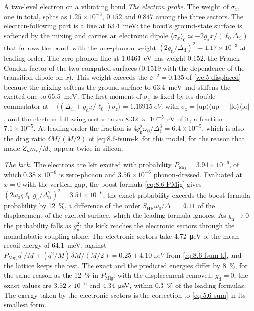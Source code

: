 \begin{workedexample}{A two-level electron on a vibrating bond}
\emph{The electron probe.} The weight of $\sigma_x$, one in total, splits as $1.25\times10^{-3}$, $0.152$ and $0.847$ among the three sectors. The electron-following part is a line at \SI{63.4}{meV}: the bond's ground-state surface is softened by the mixing and carries an electronic dipole $\langle\sigma_x\rangle_0 \simeq -2g_{\mathrm{n}}x/(\ell_0\Delta_{\mathrm{tl}})$ that follows the bond, with the one-phonon weight $(2g_{\mathrm{n}}/\Delta_{\mathrm{tl}})^2 = 1.17\times10^{-3}$ at leading order. The zero-phonon line at \SI{1.0463}{eV} has weight $0.152$, the Franck--Condon factor of the two computed surfaces (0.1519 with the dependence of the transition dipole on $x$). This weight exceeds the $\ee^{-2} = 0.135$ of \cref{we:5-displaced} because the mixing softens the ground surface to \SI{63.4}{meV} and stiffens the excited one to \SI{65.5}{meV}. The first moment of $\sigma_x$ is fixed by its double commutator at $-\langle(\Delta_{\mathrm{tl}} + g_{\mathrm{d}}x/\ell_0)\sigma_z\rangle = \SI{1.16915}{eV}$, with $\sigma_z = |\mathrm{up}\rangle\langle\mathrm{up}| - |\mathrm{lo}\rangle\langle\mathrm{lo}|$, and the electron-following sector takes \SI{8.32e-5}{eV} of it, a fraction $7.1\times10^{-5}$. At leading order the fraction is $4g_{\mathrm{n}}^2\omega_0/\Delta_{\mathrm{tl}}^3 = 6.4\times10^{-5}$, which is also the drag ratio $\delta M/(M/2)$ of \cref{eq:8.6-fsum-k} for this model, for the reason that made $Z_\kappa m_e/M_\kappa$ appear twice in silicon.

\emph{The kick.} The electrons are left excited with probability $P_{\mathrm{Mig}} = 3.94\times10^{-6}$, of which $0.38\times10^{-6}$ is zero-phonon and $3.56\times10^{-6}$ phonon-dressed. Evaluated at $x = 0$ with the vertical gap, the boost formula \cref{eq:8.6-PMig} gives $(2\omega_0q\ell_0g_{\mathrm{n}}/\Delta_{\mathrm{tl}}^2)^2 = 3.51\times10^{-6}$; the exact probability exceeds the boost-formula probability by \SI{12}{\percent}, a difference of the order $S_{\mathrm{HR}}\omega_0/\Delta_{\mathrm{tl}} = 0.11$ of the displacement of the excited surface, which the leading formula ignores. As $g_{\mathrm{n}} \to 0$ the probability falls as $g_{\mathrm{n}}^2$: the kick reaches the electronic sectors through the nonadiabatic coupling alone. The electronic sectors take \SI{4.72}{\micro eV} of the mean recoil energy of \SI{64.1}{meV}, against $P_{\mathrm{Mig}}\,q^2/M + (q^2/M)\,\delta M/(M/2) = 0.25 + \SI{4.10}{\micro eV}$ from \cref{eq:8.6-fsum-k}, and the lattice keeps the rest. The exact and the predicted energies differ by \SI{8}{\percent}, for the same reason as the \SI{12}{\percent} in $P_{\mathrm{Mig}}$: with the displacement removed, $g_{\mathrm{d}} = 0$, the exact values are $3.52\times10^{-6}$ and \SI{4.34}{\micro eV}, within \SI{0.3}{\percent} of the leading formulas. The energy taken by the electronic sectors is the correction to \cref{eq:5.6-sum} in its smallest form.


\end{workedexample}
